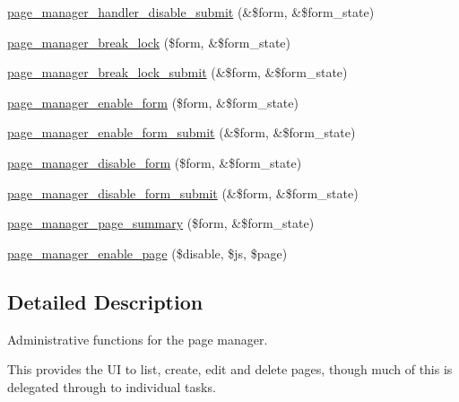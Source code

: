 \begin{DoxyCompactItemize}
\hyperlink{page__manager_8admin_8inc_a852cb808507dacf147798447b0fcb381}{page\_\-manager\_\-handler\_\-disable\_\-submit} (\&\$form, \&\$form\_\-state)
\item 
\hyperlink{page__manager_8admin_8inc_a84d9035a181a37f694cd057c0269b3d5}{page\_\-manager\_\-break\_\-lock} (\$form, \&\$form\_\-state)
\item 
\hyperlink{page__manager_8admin_8inc_a8c7f274f66fb82c088351d36b1ac67c9}{page\_\-manager\_\-break\_\-lock\_\-submit} (\&\$form, \&\$form\_\-state)
\item 
\hyperlink{page__manager_8admin_8inc_aeff4bbd8d593ad0f6880a9a029b4b7b6}{page\_\-manager\_\-enable\_\-form} (\$form, \&\$form\_\-state)
\item 
\hyperlink{page__manager_8admin_8inc_a1a0c114af3f35d42210cfe1bf4af2ca1}{page\_\-manager\_\-enable\_\-form\_\-submit} (\&\$form, \&\$form\_\-state)
\item 
\hyperlink{page__manager_8admin_8inc_a957c3f3d897ca05673da82bc212b2a27}{page\_\-manager\_\-disable\_\-form} (\$form, \&\$form\_\-state)
\item 
\hyperlink{page__manager_8admin_8inc_a371e6b2f2287ca725b866c1f2c6312d6}{page\_\-manager\_\-disable\_\-form\_\-submit} (\&\$form, \&\$form\_\-state)
\item 
\hyperlink{page__manager_8admin_8inc_a1151aa10f7c2d1f78f59c62716dd3958}{page\_\-manager\_\-page\_\-summary} (\$form, \&\$form\_\-state)
\item 
\hyperlink{page__manager_8admin_8inc_a4199dbaf2894cca0b20bccbd5a9f821b}{page\_\-manager\_\-enable\_\-page} (\$disable, \$js, \$page)
\end{DoxyCompactItemize}


\subsection{Detailed Description}
Administrative functions for the page manager.

This provides the UI to list, create, edit and delete pages, though much of this is delegated through to individual tasks. 

